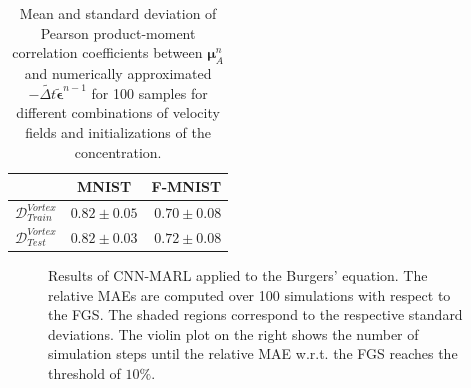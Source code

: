 \documentclass{article}
\theoremstyle{plain}
\theoremstyle{definition}
\theoremstyle{remark}
\begin{document}
\begin{table}[!ht]
\caption{Mean and standard deviation of Pearson product-moment correlation coefficients between $\boldsymbol \mu_A^n$ and numerically approximated $- \widetilde{\Delta t} \tilde{\boldsymbol\epsilon}^{n-1}$ for 100 samples for different combinations of velocity fields and initializations of the concentration.}
\vskip 0.15in
\centering
\begin{tabular}{@{}l|cr@{}}
\toprule
 & MNIST & F-MNIST  \\
\hline 
$\mathcal D^{Vortex}_{Train}$ & $0.82 \pm 0.05$ & $0.70 \pm 0.08$  \\ 
$\mathcal D^{Vortex}_{Test}$ & $0.82 \pm 0.03$ & $0.72 \pm 0.08$ \\ \bottomrule
\end{tabular}
\label{tab:action_correlation}
\end{table}

\begin{figure}
\centering
    \caption{Results of CNN-MARL applied to the Burgers' equation. The relative MAEs are computed over 100 simulations with respect to the FGS. The shaded regions correspond to the respective standard deviations. The violin plot on the right shows the number of simulation steps until the relative MAE w.r.t. the FGS reaches the threshold of $10\%$.}
    \label{fig:burgers_errors}
\end{figure}
\end{document}
